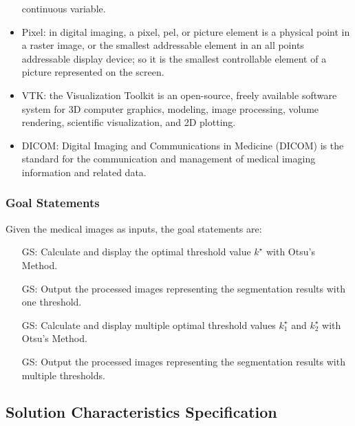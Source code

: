 \documentclass[12pt]{article}
\begin{document}
\begin{itemize}
  continuous variable.
\item Pixel: in digital imaging, a pixel, pel, or picture element is a physical
  point in a raster image, or the smallest addressable element in an all points
  addressable display device; so it is the smallest controllable element of a
  picture represented on the screen.
\item VTK: the Visualization Toolkit is an open-source, freely available
  software system for 3D computer graphics, modeling, image processing, volume
  rendering, scientific visualization, and 2D plotting.
\item DICOM: Digital Imaging and Communications in Medicine (DICOM) is the
  standard for the communication and management of medical imaging information
  and related data.
\end{itemize}

\subsubsection{Goal Statements}
\label{sec_goalstatements}
\noindent Given the medical images as inputs, the goal statements are:

\begin{itemize}

\item[GS\refstepcounter{goalnum}\thegoalnum \label{GS_calk}:]
Calculate and display the optimal threshold value $k^{\star}$ with Otsu’s
Method.

\item[GS\refstepcounter{goalnum}\thegoalnum \label{GS_outputimage}:]
Output the processed images representing the segmentation results with one
threshold.

\item[GS\refstepcounter{goalnum}\thegoalnum \label{GS_multicalk}:]
Calculate and display multiple optimal threshold values $k^{\star}_{1}$ and
$k^{\star}_{2}$ with Otsu’s Method.

\item[GS\refstepcounter{goalnum}\thegoalnum \label{GS_multioutputimage}:]
Output the processed images representing the segmentation results with multiple
thresholds.

\end{itemize}

\subsection{Solution Characteristics Specification}
\end{document}
